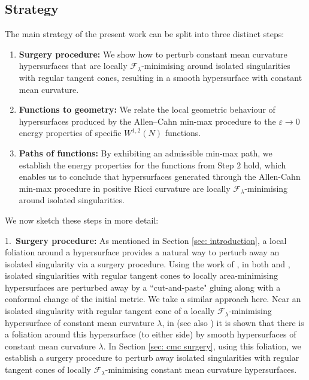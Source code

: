 \documentclass[11pt]{article}
\begin{document}
\subsection{Strategy}\label{subsec: strategy}

The main strategy of the present work can be split into three distinct steps:
\begin{enumerate}
    \item \textbf{Surgery procedure:} We show how to perturb constant mean curvature hypersurfaces that are locally $\mathcal{F}_\lambda$-minimising around isolated singularities with regular tangent cones, resulting in a smooth hypersurface with constant mean curvature.

    \item \textbf{Functions to geometry:} We relate the local geometric behaviour of hypersurfaces produced by the Allen--Cahn min-max procedure to the $\varepsilon \rightarrow 0$ energy properties of specific $W^{1,2}(N)$ functions.
    
    \item \textbf{Paths of functions:} By exhibiting an admissible min-max path, we establish the energy properties for the functions from Step $2$ hold, which enables us to conclude that hypersurfaces generated through the Allen-Cahn min-max procedure in positive Ricci curvature are locally $\mathcal{F}_\lambda$-minimising around isolated singularities.
\end{enumerate}

We now sketch these steps in more detail: 

\bigskip

1.~\textbf{Surgery procedure:}
As mentioned in Section \ref{sec: introduction}, a local foliation around a hypersurface provides a natural way to perturb away an isolated singularity via a surgery procedure. Using the work of \cite{hardt-simon}, in both \cite{Smale} and \cite{C-L-S}, isolated singularities with regular tangent cones to locally area-minimising hypersurfaces are perturbed away by a “cut-and-paste" gluing along with a conformal change of the initial metric. We take a similar approach here. Near an isolated singularity with regular tangent cone of a locally $\mathcal{F}_\lambda$-minimising hypersurface of constant mean curvature $\lambda$, in \cite{Kostas23} (see also \cite{BL24}) it is shown that there is a foliation around this hypersurface (to either side) by smooth hypersurfaces of constant mean curvature $\lambda$. In Section \ref{sec: cmc surgery}, using this foliation, we establish a surgery procedure to perturb away isolated singularities with regular tangent cones of locally $\mathcal{F}_\lambda$-minimising constant mean curvature hypersurfaces.
\end{document}
